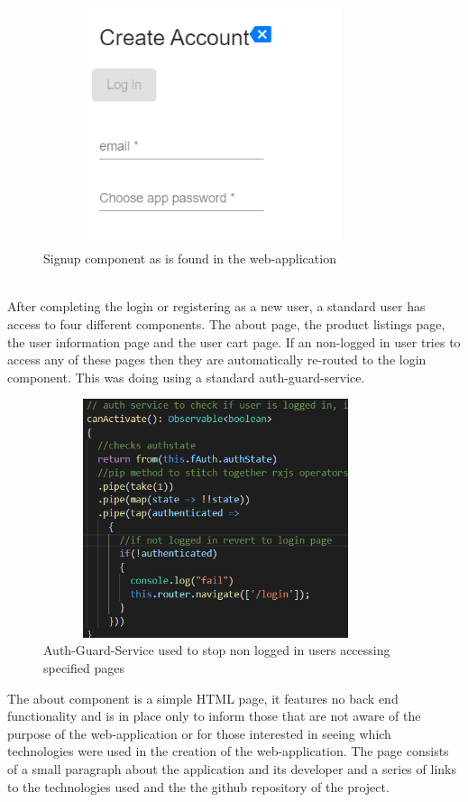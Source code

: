 \begin{figure}[h!]
    	\caption{Signup component as is found in the web-application}
	\centering
	\includegraphics[width=0.9\textwidth, height=7cm]{images/signup.png}
\end{figure}

\\
After completing the login or registering as a new user, a standard user has access to four different components. The about page, the product listings page, the user information page and the user cart page. If an non-logged in user tries to access any of these pages then they are automatically re-routed to the login component. This was doing using a standard auth-guard-service. 

\begin{figure}[h!]
    	\caption{Auth-Guard-Service used to stop non logged in users accessing specified pages}
	\centering
	\includegraphics[width=0.9\textwidth, height=7cm]{images/authguard.png}
\end{figure}

\newpage
The about component is a simple HTML page, it features no back end functionality and is in place only to inform those that are not aware of the purpose of the web-application or for those interested in seeing which technologies were used in the creation of the web-application. The page consists of a small paragraph about the application and its developer and a series of links to the technologies used and the the github repository of the project. 

